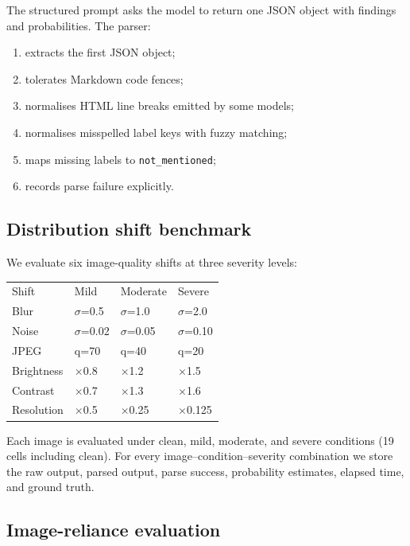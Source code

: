The structured prompt asks the model to return one JSON object with findings and probabilities. The parser:

\begin{enumerate}
\item extracts the first JSON object;
\item tolerates Markdown code fences;
\item normalises HTML line breaks emitted by some models;
\item normalises misspelled label keys with fuzzy matching;
\item maps missing labels to \texttt{not\_mentioned};
\item records parse failure explicitly.
\end{enumerate}

\subsection{Distribution shift benchmark}

We evaluate six image-quality shifts at three severity levels:

\begin{table}[t]
\centering
\small
\begin{tabular}{llll}
\hline
Shift & Mild & Moderate & Severe \\
Blur & $\sigma$=0.5 & $\sigma$=1.0 & $\sigma$=2.0 \\
Noise & $\sigma$=0.02 & $\sigma$=0.05 & $\sigma$=0.10 \\
JPEG & q=70 & q=40 & q=20 \\
Brightness & $\times$0.8 & $\times$1.2 & $\times$1.5 \\
Contrast & $\times$0.7 & $\times$1.3 & $\times$1.6 \\
Resolution & $\times$0.5 & $\times$0.25 & $\times$0.125 \\
\hline
\end{tabular}
\end{table}

Each image is evaluated under clean, mild, moderate, and severe conditions (19 cells including clean). For every image--condition--severity combination we store the raw output, parsed output, parse success, probability estimates, elapsed time, and ground truth.

\subsection{Image-reliance evaluation}

